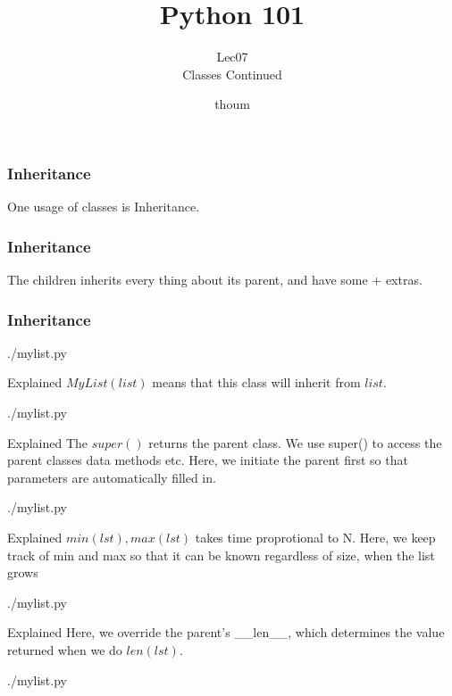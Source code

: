 \documentclass{beamer}
\title{Python 101}
\subtitle{Lec07 \\ Classes Continued}
\author{thoum}
\begin{document}
\frame{\titlepage}

\begin{frame}
\frametitle{Inheritance}
One usage of classes is Inheritance.
\end{frame}

\begin{frame}
\frametitle{Inheritance}
The children inherits every thing about its parent, and have some + extras.
\end{frame}

\begin{frame}[fragile]
\frametitle{Inheritance}
\begin{lstinputlisting}
  {./mylist.py}
\end{lstinputlisting}
\end{frame}

\begin{frame}{Explained}
  $MyList(list)$ means that this class will inherit from $list$.
  \begin{lstinputlisting}[firstline=1, lastline=1]
  {./mylist.py}
\end{lstinputlisting}
\end{frame}

\begin{frame}{Explained}
  The $super()$ returns the parent class. We use super() to access the parent
  classes data methods etc. Here, we initiate the parent first so that
  parameters are automatically filled in.
  \begin{lstinputlisting}[firstline=1, lastline=3]
  {./mylist.py}
\end{lstinputlisting}
\end{frame}

\begin{frame}{Explained}
  $min(lst), max(lst)$ takes time proprotional to N. Here, we keep track of min
  and max so that it can be known regardless of size, when the list grows
  \begin{lstinputlisting}[firstline=1, lastline=6]
  {./mylist.py}
  \end{lstinputlisting}
\end{frame}

\begin{frame}{Explained}
  Here, we override the parent's \_\_len\_\_, which determines the value
  returned when we do $len(lst)$.
  \begin{lstinputlisting}[firstline=9, lastline=10]
    {./mylist.py}
  \end{lstinputlisting}
\end{frame}
\end{document}
